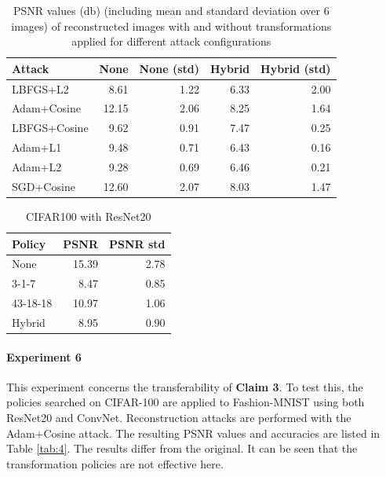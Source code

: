 \begin{table}[htb!]
    \centering
    \begin{tabular}{lrrrr}
        \hline
         Attack       &   None &   None  (std) &   Hybrid &   Hybrid  (std) \\
        \hline
         LBFGS+L2     &               8.61 &             1.22 &                 6.33 &                2.00 \\
         Adam+Cosine  &              12.15 &             2.06 &                 8.25 &                1.64 \\
         LBFGS+Cosine &               9.62 &             0.91 &                 7.47 &                0.25 \\
         Adam+L1      &               9.48 &             0.71 &                 6.43 &                0.16 \\
         Adam+L2      &               9.28 &             0.69 &                 6.46 &                0.21 \\
         SGD+Cosine   &              12.60 &             2.07 &                 8.03 &                1.47 \\
        \hline
        \end{tabular}
    \caption{PSNR values (db) (including mean and standard deviation over $6$ images) of reconstructed images with and without transformations applied for different attack configurations}
    \label{tab:2}
\end{table}
\begin{table}[htb!]
    \centering
        \begin{tabular}{lrr}
            \hline
             Policy   &   PSNR &   PSNR std \\
            \hline
             None     &       15.39 &       2.78 \\
             3-1-7    &        8.47 &       0.85 \\
             43-18-18 &       10.97 &       1.06 \\
             Hybrid   &        8.95 &       0.90 \\
            \hline
        \end{tabular}
    \caption{CIFAR100 with ResNet20}
    \label{tab:my_label}
\end{table}

\paragraph{Experiment 6} This experiment concerns the transferability of \textbf{Claim 3}. To test this, the policies searched on CIFAR-100 are applied to Fashion-MNIST using both ResNet20 and ConvNet. Reconstruction attacks are performed with the Adam+Cosine attack. The resulting PSNR values and accuracies are listed in Table \ref{tab:4}. The results differ from the original. It can be seen that the transformation policies are not effective here.

